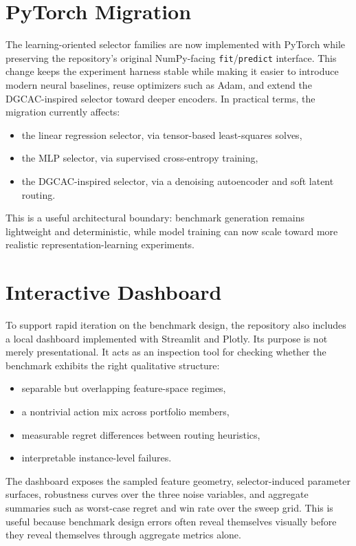 \documentclass[11pt]{report}
\begin{document}
\section{PyTorch Migration}

The learning-oriented selector families are now implemented with PyTorch while preserving the repository's original NumPy-facing \texttt{fit}/\texttt{predict} interface. This change keeps the experiment harness stable while making it easier to introduce modern neural baselines, reuse optimizers such as Adam, and extend the DGCAC-inspired selector toward deeper encoders. In practical terms, the migration currently affects:
\begin{itemize}[leftmargin=2em]
\item the linear regression selector, via tensor-based least-squares solves,
\item the MLP selector, via supervised cross-entropy training,
\item the DGCAC-inspired selector, via a denoising autoencoder and soft latent routing.
\end{itemize}

This is a useful architectural boundary: benchmark generation remains lightweight and deterministic, while model training can now scale toward more realistic representation-learning experiments.

\section{Interactive Dashboard}

To support rapid iteration on the benchmark design, the repository also includes a local dashboard implemented with Streamlit and Plotly. Its purpose is not merely presentational. It acts as an inspection tool for checking whether the benchmark exhibits the right qualitative structure:
\begin{itemize}[leftmargin=2em]
\item separable but overlapping feature-space regimes,
\item a nontrivial action mix across portfolio members,
\item measurable regret differences between routing heuristics,
\item interpretable instance-level failures.
\end{itemize}

The dashboard exposes the sampled feature geometry, selector-induced parameter surfaces, robustness curves over the three noise variables, and aggregate summaries such as worst-case regret and win rate over the sweep grid. This is useful because benchmark design errors often reveal themselves visually before they reveal themselves through aggregate metrics alone.
\end{document}
